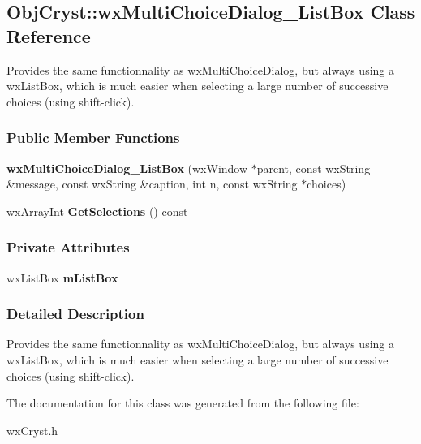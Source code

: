 \subsection{\-Obj\-Cryst\-:\-:wx\-Multi\-Choice\-Dialog\-\_\-\-List\-Box \-Class \-Reference}
\label{a00134}


\-Provides the same functionnality as wx\-Multi\-Choice\-Dialog, but always using a wx\-List\-Box, which is much easier when selecting a large number of successive choices (using shift-\/click).  


\subsubsection*{\-Public \-Member \-Functions}
\begin{DoxyCompactItemize}
\item 
{\bfseries wx\-Multi\-Choice\-Dialog\-\_\-\-List\-Box} (wx\-Window $\ast$parent, const wx\-String \&message, const wx\-String \&caption, int n, const wx\-String $\ast$choices)\label{a00134_a3048c7db35d3c35a993ca818f8ec3087}

\item 
wx\-Array\-Int {\bfseries \-Get\-Selections} () const \label{a00134_a128fb92ed6304bca6df23e9839b0d44d}

\end{DoxyCompactItemize}
\subsubsection*{\-Private \-Attributes}
\begin{DoxyCompactItemize}
\item 
wx\-List\-Box {\bfseries m\-List\-Box}\label{a00134_a145d64abc35498abb940f28ab81aebda}

\end{DoxyCompactItemize}


\subsubsection{\-Detailed \-Description}
\-Provides the same functionnality as wx\-Multi\-Choice\-Dialog, but always using a wx\-List\-Box, which is much easier when selecting a large number of successive choices (using shift-\/click). 

\-The documentation for this class was generated from the following file\-:\begin{DoxyCompactItemize}
\item 
wx\-Cryst.\-h\end{DoxyCompactItemize}
